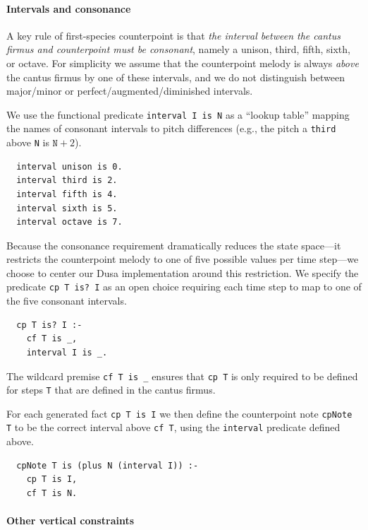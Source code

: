 \paragraph{Intervals and consonance}

A key rule of first-species counterpoint is that \emph{the interval between the cantus firmus and counterpoint must be consonant}, namely a unison, third, fifth, sixth, or octave. For simplicity we assume that the counterpoint melody is always \emph{above} the cantus firmus by one of these intervals, and we do not distinguish between major/minor or perfect/augmented/diminished intervals.

We use the functional predicate \verb|interval I is N| as a ``lookup table'' mapping the names of consonant intervals to pitch differences (e.g., the pitch a \verb|third| above \verb|N| is $\texttt{N}+2$).

\begin{verbatim}
  interval unison is 0.
  interval third is 2.
  interval fifth is 4.
  interval sixth is 5.
  interval octave is 7.
\end{verbatim}

Because the consonance requirement dramatically reduces the state space---it restricts the counterpoint melody to one of five possible values per time step---we choose to center our Dusa implementation around this restriction. We specify the predicate \verb|cp T is? I| as an open choice requiring each time step to map to one of the five consonant intervals.
%
\begin{verbatim}
  cp T is? I :-
    cf T is _,
    interval I is _.
\end{verbatim}
%
The wildcard premise \verb|cf T is _| ensures that \verb|cp T| is only
required to be defined for steps \verb|T| that are defined in the
cantus firmus.

For each generated fact \verb|cp T is I| we then define the counterpoint note \verb|cpNote T| to be the correct interval above \verb|cf T|, using the \verb|interval| predicate defined above.

\begin{verbatim}
  cpNote T is (plus N (interval I)) :-
    cp T is I,
    cf T is N.
\end{verbatim}



\paragraph{Other vertical constraints}

